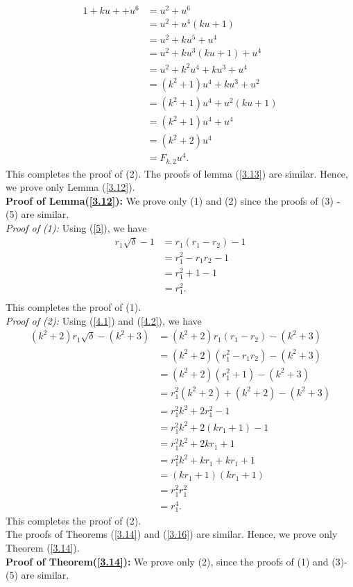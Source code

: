 \begin{align*}
1+ku++u^6&=u^2+u^6\\
&=u^2+u^4(ku+1)\\
&=u^2+ku^5+u^4\\
&=u^2+ku^3(ku+1)+u^4\\
&=u^2+k^2u^4+ku^3+u^4\\
&=(k^2+1)u^4+ku^3+u^2\\
&=(k^2+1)u^4+u^2(ku+1)\\
&=(k^2+1)u^4+u^4\\
&=(k^2+2)u^4\\
&=F_{k,2}u^4.
\end{align*}
This completes the proof of (2).
The proofs of lemma (\ref{3.13}) are similar. Hence, we prove only Lemma (\ref{3.12}).\\
\textbf{Proof of Lemma(\ref{3.12}):} We prove only (1) and (2) since the proofs of (3) - (5) are similar.\\
\textit{Proof of (1):}
Using (\ref{5}), we have
\begin{align*}
r_1\sqrt{\delta}-1&=r_1(r_1-r_2)-1\\
&=r_1^2-r_1r_2-1\\
&=r_1^2+1-1\\
&=r_1^2.\\
\end{align*}
This completes the proof of (1).\\
\textit{Proof of (2):}
Using (\ref{4.1}) and (\ref{4.2}), we have
\begin{align*}
(k^2+2)r_1\sqrt{\delta}-(k^2+3)&=(k^2+2)r_1(r_1-r_2)-(k^2+3)\\
&=(k^2+2)(r_1^2-r_1r_2)-(k^2+3)\\
&=(k^2+2)(r_1^2+1)-(k^2+3)\\
&=r_1^2(k^2+2)+(k^2+2)-(k^2+3)\\
&=r_1^2k^2+2r_1^2-1\\
&=r_1^2k^2+2(kr_1+1)-1\\
&=r_1^2k^2+2kr_1+1\\
&=r_1^2k^2+kr_1+kr_1+1\\
&=(kr_1+1)(kr_1+1)\\
&=r_1^2r_1^2\\
&=r_1^4.
\end{align*}
This completes the proof of (2).\\
The proofs of Theorems (\ref{3.14}) and (\ref{3.16}) are similar. Hence, we prove only Theorem (\ref{3.14}).\\
\textbf{Proof of Theorem(\ref{3.14}):} We prove only (2), since the proofs of (1) and (3)-(5) are similar.\\
